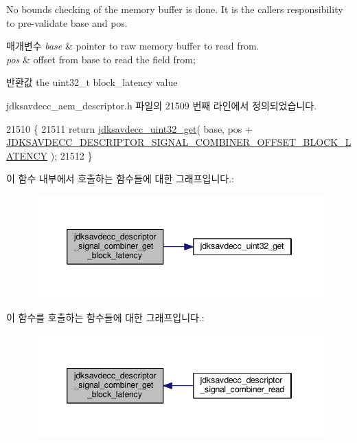 No bounds checking of the memory buffer is done. It is the caller\textquotesingle{}s responsibility to pre-\/validate base and pos.


\begin{DoxyParams}{매개변수}
{\em base} & pointer to raw memory buffer to read from. \\
\hline
{\em pos} & offset from base to read the field from; \\
\hline
\end{DoxyParams}
\begin{DoxyReturn}{반환값}
the uint32\+\_\+t block\+\_\+latency value 
\end{DoxyReturn}


jdksavdecc\+\_\+aem\+\_\+descriptor.\+h 파일의 21509 번째 라인에서 정의되었습니다.


\begin{DoxyCode}
21510 \{
21511     \textcolor{keywordflow}{return} \hyperlink{group__endian_gaefcf5bd4f368997a82f358ab89052d6b}{jdksavdecc\_uint32\_get}( base, pos + 
      \hyperlink{group__descriptor__signal__combiner_ga01fe6f39a2fde1cbc6c22ddf067109ea}{JDKSAVDECC\_DESCRIPTOR\_SIGNAL\_COMBINER\_OFFSET\_BLOCK\_LATENCY}
       );
21512 \}
\end{DoxyCode}


이 함수 내부에서 호출하는 함수들에 대한 그래프입니다.\+:
\nopagebreak
\begin{figure}[H]
\begin{center}
\leavevmode
\includegraphics[width=346pt]{group__descriptor__signal__combiner_ga37277f6de31f7f01d1ca0d389c5029df_cgraph}
\end{center}
\end{figure}




이 함수를 호출하는 함수들에 대한 그래프입니다.\+:
\nopagebreak
\begin{figure}[H]
\begin{center}
\leavevmode
\includegraphics[width=346pt]{group__descriptor__signal__combiner_ga37277f6de31f7f01d1ca0d389c5029df_icgraph}
\end{center}
\end{figure}


